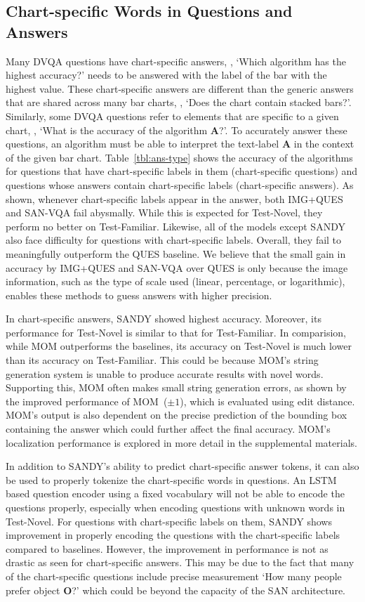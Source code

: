 \documentclass[10pt,twocolumn,letterpaper]{article}
\newcommand{\new}[1]{#1}
\begin{document}
\subsection{Chart-specific Words in Questions and Answers}
\new{
Many DVQA questions have chart-specific answers, \eg, `Which algorithm has the highest accuracy?' needs to be answered with the label of the bar with the highest value. These chart-specific answers are different than the generic answers that are shared across many bar charts, \eg, `Does the chart contain stacked bars?'. Similarly, some DVQA questions refer to elements that are specific to a given chart, \eg, `What is the accuracy of the algorithm \textbf{A}?'. To accurately answer these questions, an algorithm must be able to interpret the text-label \textbf{A} in the context of the given bar chart. Table~\ref{tbl:ans-type} shows the accuracy of the algorithms for questions that have chart-specific labels in them (chart-specific questions) and questions whose answers contain chart-specific labels (chart-specific answers). As shown, whenever chart-specific labels appear in the answer, both IMG+QUES and SAN-VQA fail abysmally. While this is expected for Test-Novel, they perform no better on Test-Familiar. Likewise, all of the models except SANDY also face difficulty for questions with chart-specific labels. Overall, they fail to meaningfully outperform the QUES baseline. We believe that the small gain in accuracy by IMG+QUES and SAN-VQA over QUES is only because the image information, such as the type of scale used (linear, percentage, or logarithmic), enables these methods to guess answers with higher precision.

In chart-specific answers, SANDY showed highest accuracy. Moreover, its performance for Test-Novel is similar to that for Test-Familiar. In comparision, while MOM outperforms the baselines, its accuracy on Test-Novel is much lower than its accuracy on Test-Familiar. This could be because MOM's string generation system is unable to produce accurate results with novel words. Supporting this, MOM often makes small string generation
errors, as shown by the improved performance of MOM~($\pm 1$), which is evaluated using edit distance. MOM's output is also dependent on the precise prediction of the bounding box containing the answer which could further affect the final accuracy. MOM's localization performance is explored in more detail in the supplemental materials.

In addition to SANDY's ability to predict chart-specific answer tokens, it can also be used to properly tokenize the chart-specific words in questions. An LSTM based question encoder using a fixed vocabulary will not be able to encode the questions properly, especially when encoding questions with unknown words in Test-Novel. For questions with chart-specific labels on them, SANDY shows improvement in properly encoding the questions with the chart-specific labels compared to baselines. However, the improvement in performance is not as drastic as seen for chart-specific answers. This may be due to the fact that many of the chart-specific questions include precise measurement \eg `How many people prefer object \textbf{O}?' which could be beyond the capacity of the SAN architecture.}
\end{document}
